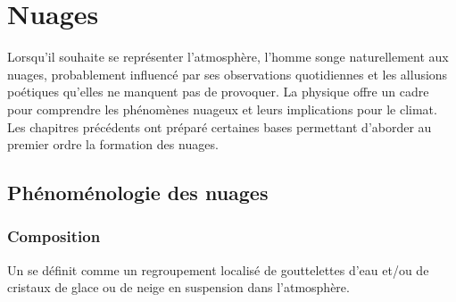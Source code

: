 \chapter{Nuages}


\bk
Lorsqu'il souhaite se représenter l'atmosphère, l'homme songe naturellement aux nuages, probablement influencé par ses observations quotidiennes et les allusions poétiques qu'elles ne manquent pas de provoquer. La physique offre un cadre pour comprendre les phénomènes nuageux et leurs implications pour le climat. Les chapitres précédents ont préparé certaines bases permettant d'aborder au premier ordre la formation des nuages.  

\mk
\section{Phénoménologie des nuages}

\sk
\subsection{Composition}

Un  se définit comme un regroupement localisé de gouttelettes d'eau et/ou de cristaux de glace ou de neige en suspension dans l'atmosphère. 



